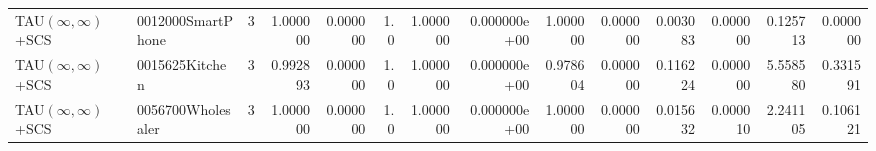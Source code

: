 \begin{tabular}{llrr|r|rr|rr|rr|rrr}
TAU$(\infty, \infty)$+SCS &      0012000SmartPhone &       3 & 1.000000 & 0.000000 &  1.0 &      1.000000 & 0.000000e+00 &      1.000000 & 0.000000 &      0.003083 &    0.000000 &     0.125713 &    0.000000 \\
TAU$(\infty, \infty)$+SCS &         0015625Kitchen &       3 & 0.992893 & 0.000000 &  1.0 &      1.000000 & 0.000000e+00 &      0.978604 & 0.000000 &      0.116224 &    0.000000 &     5.558580 &    0.331591 \\
TAU$(\infty, \infty)$+SCS &      0056700Wholesaler &       3 & 1.000000 & 0.000000 &  1.0 &      1.000000 & 0.000000e+00 &      1.000000 & 0.000000 &      0.015632 &    0.000010 &     2.241105 &    0.106121 \\
\bottomrule
\end{tabular}
